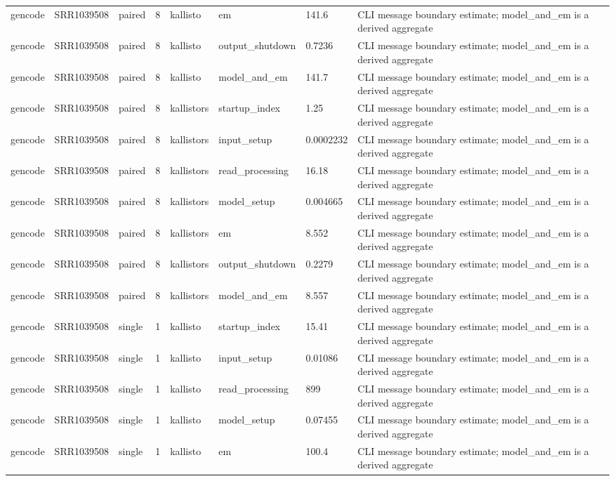 \begin{tabular}{llllllll}
gencode & SRR1039508 & paired & 8 & kallisto & em & 141.6 & CLI message boundary estimate; model\_and\_em is a derived aggregate \\
gencode & SRR1039508 & paired & 8 & kallisto & output\_shutdown & 0.7236 & CLI message boundary estimate; model\_and\_em is a derived aggregate \\
gencode & SRR1039508 & paired & 8 & kallisto & model\_and\_em & 141.7 & CLI message boundary estimate; model\_and\_em is a derived aggregate \\
gencode & SRR1039508 & paired & 8 & kallistors & startup\_index & 1.25 & CLI message boundary estimate; model\_and\_em is a derived aggregate \\
gencode & SRR1039508 & paired & 8 & kallistors & input\_setup & 0.0002232 & CLI message boundary estimate; model\_and\_em is a derived aggregate \\
gencode & SRR1039508 & paired & 8 & kallistors & read\_processing & 16.18 & CLI message boundary estimate; model\_and\_em is a derived aggregate \\
gencode & SRR1039508 & paired & 8 & kallistors & model\_setup & 0.004665 & CLI message boundary estimate; model\_and\_em is a derived aggregate \\
gencode & SRR1039508 & paired & 8 & kallistors & em & 8.552 & CLI message boundary estimate; model\_and\_em is a derived aggregate \\
gencode & SRR1039508 & paired & 8 & kallistors & output\_shutdown & 0.2279 & CLI message boundary estimate; model\_and\_em is a derived aggregate \\
gencode & SRR1039508 & paired & 8 & kallistors & model\_and\_em & 8.557 & CLI message boundary estimate; model\_and\_em is a derived aggregate \\
gencode & SRR1039508 & single & 1 & kallisto & startup\_index & 15.41 & CLI message boundary estimate; model\_and\_em is a derived aggregate \\
gencode & SRR1039508 & single & 1 & kallisto & input\_setup & 0.01086 & CLI message boundary estimate; model\_and\_em is a derived aggregate \\
gencode & SRR1039508 & single & 1 & kallisto & read\_processing & 899 & CLI message boundary estimate; model\_and\_em is a derived aggregate \\
gencode & SRR1039508 & single & 1 & kallisto & model\_setup & 0.07455 & CLI message boundary estimate; model\_and\_em is a derived aggregate \\
gencode & SRR1039508 & single & 1 & kallisto & em & 100.4 & CLI message boundary estimate; model\_and\_em is a derived aggregate \\

\end{tabular}

